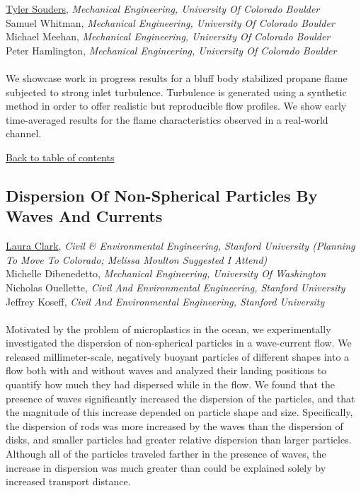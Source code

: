 \underline{Tyler Souders}, \textit{Mechanical Engineering, University Of Colorado Boulder}\\ 
{Samuel Whitman}, \textit{Mechanical Engineering, University Of Colorado Boulder}\\ 
{Michael Meehan}, \textit{Mechanical Engineering, University Of Colorado Boulder}\\ 
{Peter Hamlington}, \textit{Mechanical Engineering, University Of Colorado Boulder}\\ 
\vspace{-0.1 in} \\ 
\noindent We showcase work in progress results for a bluff body stabilized propane flame subjected to strong inlet turbulence. Turbulence is generated using a synthetic method in order to offer realistic but reproducible flow profiles. We show early time-averaged results for the flame characteristics observed in a real-world channel. \\ 
\begin{flushright}\vspace{-0.2 in}\hyperlink{toc}{Back to table of contents}\end{flushright}\vspace{-0.2 in}
\hypertarget{LauraClark}{\subsection*{\color{CUGOLD} Dispersion Of Non-Spherical Particles By Waves And Currents}} \vsp 
\underline{Laura Clark}, \textit{Civil & Environmental Engineering, Stanford University (Planning To Move To Colorado; Melissa Moulton Suggested I Attend)}\\ 
{Michelle Dibenedetto}, \textit{Mechanical Engineering, University Of Washington}\\ 
{Nicholas Ouellette}, \textit{Civil And Environmental Engineering, Stanford University}\\ 
{Jeffrey Koseff}, \textit{Civil And Environmental Engineering, Stanford University}\\ 
\vspace{-0.1 in} \\ 
\noindent Motivated by the problem of microplastics in the ocean, we experimentally investigated the dispersion of non-spherical particles in a wave-current flow. We released millimeter-scale, negatively buoyant particles of different shapes into a flow both with and without waves and analyzed their landing positions to quantify how much they had dispersed while in the flow. We found that the presence of waves significantly increased the dispersion of the particles, and that the magnitude of this increase depended on particle shape and size. Specifically, the dispersion of rods was more increased by the waves than the dispersion of disks, and smaller particles had greater relative dispersion than larger particles. Although all of the particles traveled farther in the presence of waves, the increase in dispersion was much greater than could be explained solely by increased transport distance. \\ 

